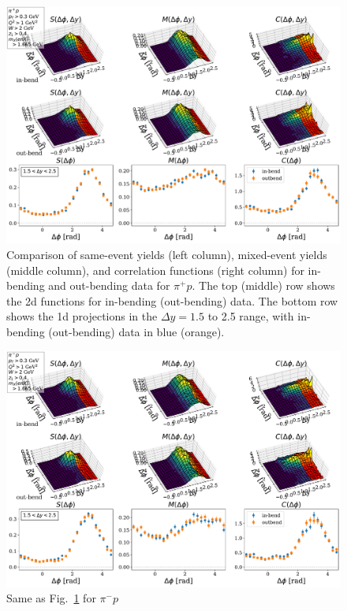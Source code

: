 \begin{figure}
    \centering
    \includegraphics[width=\textwidth]{images/smc_inout_pi+p.pdf}
    \caption{Comparison of same-event yields (left column), mixed-event yields (middle column), and correlation functions (right column) for in-bending and out-bending data for $\pi^+ p$.  The top (middle) row shows the 2d functions for in-bending (out-bending) data.  The bottom row shows the 1d projections in the $\Delta y=1.5$ to 2.5 range, with in-bending (out-bending) data in blue (orange).}
    \label{fig:smc_inout_pi+p}
\end{figure}

\begin{figure}
    \centering
    \includegraphics[width=\textwidth]{images/smc_inout_pi-p.pdf}
    \caption{Same as Fig.~\ref{fig:smc_inout_pi+p} for $\pi^- p$}
    \label{fig:smc_inout_pi-p}
\end{figure}

